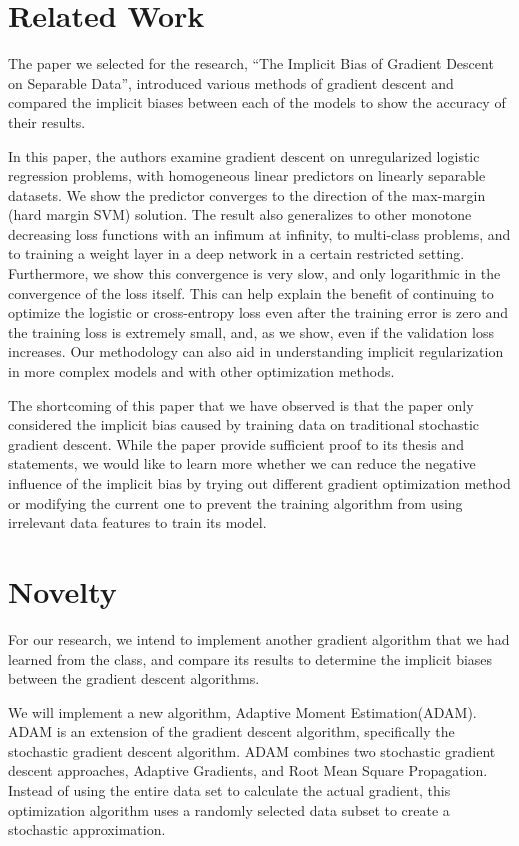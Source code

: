 \section{Related Work}

The paper we selected for the research, “The Implicit Bias of Gradient Descent on Separable Data”, introduced various methods of gradient descent and compared the implicit biases between each of the models to show the accuracy of their results.

In this paper, the authors examine gradient descent on unregularized logistic regression problems, with homogeneous linear predictors on linearly separable datasets. We show the predictor converges to the direction of the max-margin (hard margin SVM) solution. The result also generalizes to other monotone decreasing loss functions with an infimum at infinity, to multi-class problems, and to training a weight layer in a deep network in a certain restricted setting.\cite{1} Furthermore, we show this convergence is very slow, and only logarithmic in the convergence of the loss itself. This can help explain the benefit of continuing to optimize the logistic or cross-entropy loss even after the training error is zero and the training loss is extremely small, and, as we show, even if the validation loss increases. Our methodology can also aid in understanding implicit regularization in more complex models and with other optimization methods.

The shortcoming of this paper that we have observed is that the paper only considered the implicit bias caused by training data on traditional stochastic gradient descent. While the paper provide sufficient proof to its thesis and statements, we would like to learn more whether we can reduce the negative influence of the implicit bias by trying out different gradient optimization method or modifying the current one to prevent the training algorithm from using irrelevant data features to train its model.

\section{Novelty}

For our research, we intend to implement another gradient algorithm that we had learned from the class, and compare its results to determine the implicit biases between the gradient descent algorithms.

We will implement a new algorithm, Adaptive Moment Estimation(ADAM). ADAM is an extension of the gradient descent algorithm, specifically the stochastic gradient descent algorithm. ADAM combines two stochastic gradient descent approaches, Adaptive Gradients, and Root Mean Square Propagation. Instead of using the entire data set to calculate the actual gradient, this optimization algorithm uses a randomly selected data subset to create a stochastic approximation.


